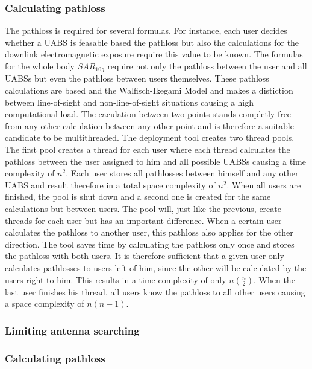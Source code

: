 \subsubsection{Calculating pathloss}
The pathloss is required for several formulas. For instance, each user decides whether a \gls{UABS} is feasable based 
the pathloss but also the calculations for the downlink electromagnetic 
exposure require this value to be known. The formulas for the whole body $SAR_{10g}$ require not only the pathloss between the user
and all \gls{UABS}s but even the pathloss between users themselves. These pathloss calculations are based and the Walfisch-Ikegami 
Model and makes a distiction between line-of-sight and non-line-of-sight situations causing a high computational load. The caculation between two points stands completly free from
any other calculation between any other point and is therefore a suitable candidate to be multithreaded. The deployment tool creates two thread pools.
The first pool creates a thread for each user where each thread calculates the pathloss between the user assigned to him and all possible \gls{UABS}s causing a time complexity of $n^2$.
Each user stores all pathlosses between himself and any other \gls{UABS} and result therefore in a total space complexity of $n^2$.
When all users are finished, the pool is shut down and a second one is created for the same calculations but between users.
The pool will, just like the previous, create threads for each user but has an important difference.
When a certain user calculates the pathloss to another user, this pathloss also applies for the other direction. The tool saves time by calculating the pathloss only 
once and stores the pathloss with both users. It is therefore sufficient that a given user only calculates pathlosses to users left of him, since the other will 
be calculated by the users right to him. This results in a time complexity of only $n(\frac{n}{2})$. When the last user finishes his thread, all users know the pathloss to all other users causing 
a space complexity of $n(n-1)$.

\subsubsection{Limiting antenna searching}
\subsubsection{Calculating pathloss}